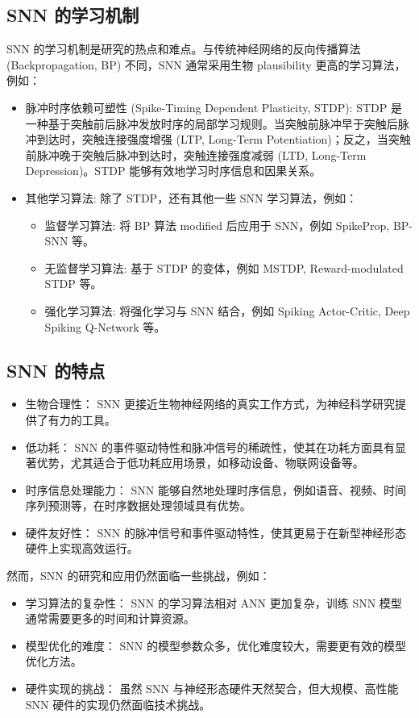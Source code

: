 \documentclass[12pt, a4paper, oneside]{ctexart}
\numberwithin{equation}{section}  %
\begin{document}
\subsection{SNN 的学习机制}
SNN 的学习机制是研究的热点和难点。与传统神经网络的反向传播算法 (Backpropagation, BP) 不同，SNN 通常采用生物 plausibility 更高的学习算法，例如：
\begin{itemize}
    \item 脉冲时序依赖可塑性 (Spike-Timing Dependent Plasticity, STDP):  STDP 是一种基于突触前后脉冲发放时序的局部学习规则。当突触前脉冲早于突触后脉冲到达时，突触连接强度增强 (LTP, Long-Term Potentiation)；反之，当突触前脉冲晚于突触后脉冲到达时，突触连接强度减弱 (LTD, Long-Term Depression)。STDP 能够有效地学习时序信息和因果关系。
    \item 其他学习算法:  除了 STDP，还有其他一些 SNN 学习算法，例如：
    \begin{itemize}
        \item 监督学习算法: 将 BP 算法 modified 后应用于 SNN，例如 SpikeProp, BP-SNN 等。
        \item 无监督学习算法: 基于 STDP 的变体，例如 MSTDP, Reward-modulated STDP 等。
        \item 强化学习算法: 将强化学习与 SNN 结合，例如 Spiking Actor-Critic, Deep Spiking Q-Network 等。
    \end{itemize}
\end{itemize}
\subsection{SNN 的特点}
\begin{itemize}
    \item 生物合理性： SNN 更接近生物神经网络的真实工作方式，为神经科学研究提供了有力的工具。
    \item 低功耗： SNN 的事件驱动特性和脉冲信号的稀疏性，使其在功耗方面具有显著优势，尤其适合于低功耗应用场景，如移动设备、物联网设备等。
    \item 时序信息处理能力： SNN 能够自然地处理时序信息，例如语音、视频、时间序列预测等，在时序数据处理领域具有优势。
    \item 硬件友好性： SNN 的脉冲信号和事件驱动特性，使其更易于在新型神经形态硬件上实现高效运行。
\end{itemize}

然而，SNN 的研究和应用仍然面临一些挑战，例如：
\begin{itemize}
    \item 学习算法的复杂性： SNN 的学习算法相对 ANN 更加复杂，训练 SNN 模型通常需要更多的时间和计算资源。
    \item 模型优化的难度： SNN 的模型参数众多，优化难度较大，需要更有效的模型优化方法。
    \item 硬件实现的挑战： 虽然 SNN 与神经形态硬件天然契合，但大规模、高性能 SNN 硬件的实现仍然面临技术挑战。
\end{itemize}
\end{document}
